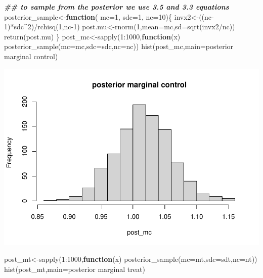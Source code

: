 \documentclass[
]{book}
\newenvironment{Shaded}{\begin{snugshade}}{\end{snugshade}}
\newcommand{\AttributeTok}[1]{\textcolor[rgb]{0.77,0.63,0.00}{#1}}
\newcommand{\ControlFlowTok}[1]{\textcolor[rgb]{0.13,0.29,0.53}{\textbf{#1}}}
\newcommand{\DecValTok}[1]{\textcolor[rgb]{0.00,0.00,0.81}{#1}}
\newcommand{\DocumentationTok}[1]{\textcolor[rgb]{0.56,0.35,0.01}{\textbf{\textit{#1}}}}
\newcommand{\FunctionTok}[1]{\textcolor[rgb]{0.00,0.00,0.00}{#1}}
\newcommand{\NormalTok}[1]{#1}
\newcommand{\OtherTok}[1]{\textcolor[rgb]{0.56,0.35,0.01}{#1}}
\newcommand{\SpecialCharTok}[1]{\textcolor[rgb]{0.00,0.00,0.00}{#1}}
\newcommand{\StringTok}[1]{\textcolor[rgb]{0.31,0.60,0.02}{#1}}
\theoremstyle{definition}
\theoremstyle{definition}
\theoremstyle{definition}
\theoremstyle{definition}
\theoremstyle{remark}
\begin{document}
\begin{Shaded}
\begin{Highlighting}[]
\DocumentationTok{\#\# to sample from the posterior we use 3.5 and 3.3 equations}
\NormalTok{   posterior\_sample}\OtherTok{\textless{}{-}}\ControlFlowTok{function}\NormalTok{( }\AttributeTok{mc=}\DecValTok{1}\NormalTok{, }\AttributeTok{sdc=}\DecValTok{1}\NormalTok{, }\AttributeTok{nc=}\DecValTok{10}\NormalTok{)\{}
\NormalTok{   invx2}\OtherTok{\textless{}{-}}\NormalTok{((nc}\DecValTok{{-}1}\NormalTok{)}\SpecialCharTok{*}\NormalTok{sdc}\SpecialCharTok{\^{}}\DecValTok{2}\NormalTok{)}\SpecialCharTok{/}\FunctionTok{rchisq}\NormalTok{(}\DecValTok{1}\NormalTok{,nc}\DecValTok{{-}1}\NormalTok{)}
\NormalTok{    post.mu}\OtherTok{\textless{}{-}}\FunctionTok{rnorm}\NormalTok{(}\DecValTok{1}\NormalTok{,}\AttributeTok{mean=}\NormalTok{mc,}\AttributeTok{sd=}\FunctionTok{sqrt}\NormalTok{(invx2}\SpecialCharTok{/}\NormalTok{nc))}
    \FunctionTok{return}\NormalTok{(post.mu)}
\NormalTok{   \}}
\NormalTok{   post\_mc}\OtherTok{\textless{}{-}}\FunctionTok{sapply}\NormalTok{(}\DecValTok{1}\SpecialCharTok{:}\DecValTok{1000}\NormalTok{,}\ControlFlowTok{function}\NormalTok{(x) }\FunctionTok{posterior\_sample}\NormalTok{(}\AttributeTok{mc=}\NormalTok{mc,}\AttributeTok{sdc=}\NormalTok{sdc,}\AttributeTok{nc=}\NormalTok{nc))}
    \FunctionTok{hist}\NormalTok{(post\_mc,}\AttributeTok{main=}\StringTok{\textquotesingle{}posterior marginal control\textquotesingle{}}\NormalTok{)}
\end{Highlighting}
\end{Shaded}

\includegraphics{_main_files/figure-latex/unnamed-chunk-31-1.pdf}

\begin{Shaded}
\begin{Highlighting}[]
\NormalTok{    post\_mt}\OtherTok{\textless{}{-}}\FunctionTok{sapply}\NormalTok{(}\DecValTok{1}\SpecialCharTok{:}\DecValTok{1000}\NormalTok{,}\ControlFlowTok{function}\NormalTok{(x) }\FunctionTok{posterior\_sample}\NormalTok{(}\AttributeTok{mc=}\NormalTok{mt,}\AttributeTok{sdc=}\NormalTok{sdt,}\AttributeTok{nc=}\NormalTok{nt))}
     \FunctionTok{hist}\NormalTok{(post\_mt,}\AttributeTok{main=}\StringTok{\textquotesingle{}posterior marginal treat\textquotesingle{}}\NormalTok{)}
\end{Highlighting}
\end{Shaded}
\end{document}
